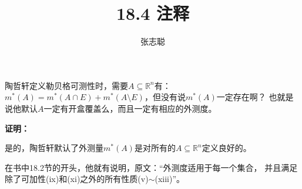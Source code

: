 \documentclass{article}
\begin{document}
\title{18.4 注释}
\author{张志聪}
\maketitle

\begin{zremark}
  陶哲轩定义勒贝格可测性时，需要$A \subseteq \mathbb{R}^n$有：
  $m^{\ast}(A) = m^{\ast}(A \cap E) + m^{\ast}(A \setminus E)$，但没有说$m^{\ast}(A)$一定存在啊？
  也就是说他默认$A$一定有开盒覆盖么，而且一定有相应的外测度。
\end{zremark}

\textbf{证明：}

是的，陶哲轩默认了外测量$m^{\ast}(A)$是对所有的$A \subseteq \mathbb{R}^n$定义良好的。

在书中18.2节的开头，他就有说明，原文：“外测度适用于每一个集合，
并且满足除了可加性(ix)和(xi)之外的所有性质(v)$\sim$(xiii)”。


\end{document}
